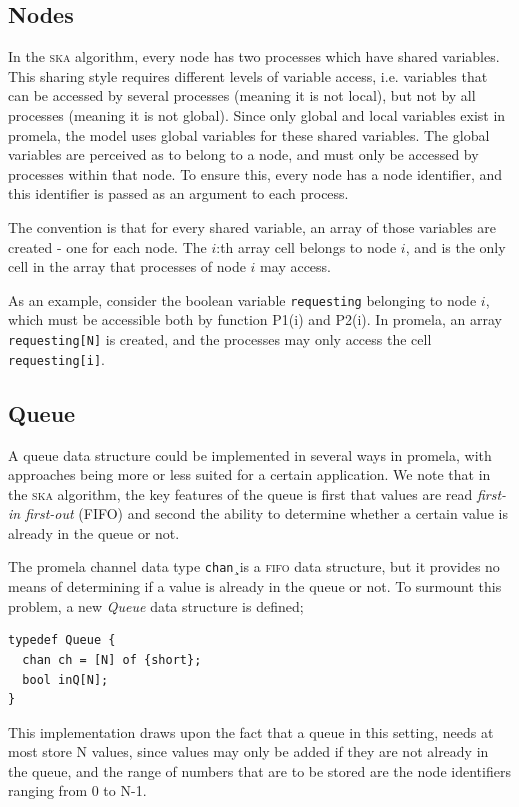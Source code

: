 \documentclass[a4paper,10pt]{llncs}
\begin{document}
\subsection{Nodes}
In the \textsc{ska} algorithm, every node has two processes which have shared variables. This sharing style requires different levels of variable access, i.e. variables that can be accessed by several processes (meaning it is not local), but not by all processes (meaning it is not global). Since only global and local variables exist in promela, the model uses global variables for these shared variables. The global variables are perceived as to belong to a node, and must only be accessed by processes within that node. To ensure this, every node has a node identifier, and this identifier is passed as an argument to each process. 

The convention is that for every shared variable, an array of those variables are created - one for each node. The $i$:th array cell belongs to node $i$, and is the only cell in the array that processes of node $i$ may access.

As an example, consider the boolean variable \texttt{requesting} belonging to node $i$, which must be accessible both by function P1(i) and P2(i). In promela, an array \texttt{requesting[N]} is created, and the processes may only access the cell \texttt{requesting[i]}.

\subsection{Queue}
A queue data structure could be implemented in several ways in promela, with approaches being more or less suited for a certain application. We note that in the \textsc{ska} algorithm, the key features of the queue is first that values are read \emph{first-in first-out} (FIFO) and second the ability to determine whether a certain value is already in the queue or not.

The promela channel data type \texttt{chan}¸is a \textsc{fifo} data structure, but it provides no means of determining if a value is already in the queue or not. To surmount this problem, a new \emph{Queue} data structure is defined;

\begin{lstlisting}
typedef Queue {
  chan ch = [N] of {short};
  bool inQ[N];
}
\end{lstlisting}

This implementation draws upon the fact that a queue in this setting, needs at most store N values, since values may only be added if they are not already in the queue, and the range of numbers that are to be stored are the node identifiers ranging from 0 to N-1.
\end{document}
